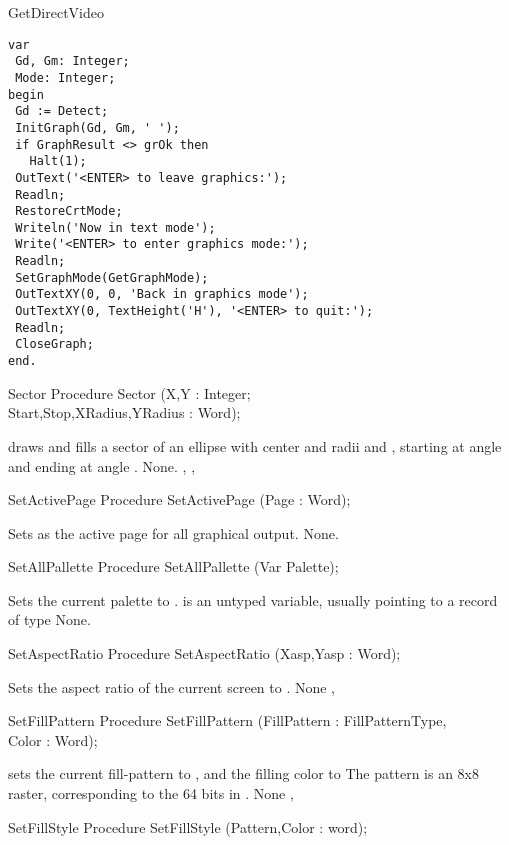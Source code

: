 \begin{function}{GetDirectVideo}
\begin{verbatim}
var
 Gd, Gm: Integer;
 Mode: Integer;
begin
 Gd := Detect;
 InitGraph(Gd, Gm, ' ');
 if GraphResult <> grOk then
   Halt(1);
 OutText('<ENTER> to leave graphics:');
 Readln;
 RestoreCrtMode;
 Writeln('Now in text mode');
 Write('<ENTER> to enter graphics mode:');
 Readln;
 SetGraphMode(GetGraphMode);
 OutTextXY(0, 0, 'Back in graphics mode');
 OutTextXY(0, TextHeight('H'), '<ENTER> to quit:');
 Readln;
 CloseGraph;
end.
\end{verbatim}
\begin{procedure}{Sector}
\Declaration
Procedure Sector (X,Y : Integer; \\ Start,Stop,XRadius,YRadius : Word);

\Description
{}
draws and fills a sector of an ellipse  with center  and radii
 and , starting at angle  and ending at angle .
\Errors
None.
\SeeAlso
{}, , 
\end{procedure}
\begin{procedure}{SetActivePage}
\Declaration
Procedure SetActivePage (Page : Word);

\Description
Sets  as the active page
for all graphical output.
\Errors
None.
\SeeAlso

\end{procedure}
\begin{procedure}{SetAllPallette}
\Declaration
Procedure SetAllPallette (Var Palette);

\Description
Sets the current palette to
.  is an untyped variable, usually pointing to a
record of type 
\Errors
None.
\SeeAlso
{}
\end{procedure}
\begin{procedure}{SetAspectRatio}
\Declaration
Procedure SetAspectRatio (Xasp,Yasp : Word);

\Description
Sets the aspect ratio of the
current screen to .
\Errors
None
\SeeAlso
{}, 
\end{procedure}
\begin{procedure}{SetFillPattern}
\Declaration
Procedure SetFillPattern (FillPattern : FillPatternType,\\ Color : Word);

\Description
{} sets the current fill-pattern to , and
the filling color to 
The pattern is an 8x8 raster, corresponding to the 64 bits in
.
\Errors
None
\SeeAlso
{}, 
\end{procedure}
\begin{procedure}{SetFillStyle}
\Declaration
Procedure SetFillStyle (Pattern,Color : word);


\end{procedure}
\end{function}
